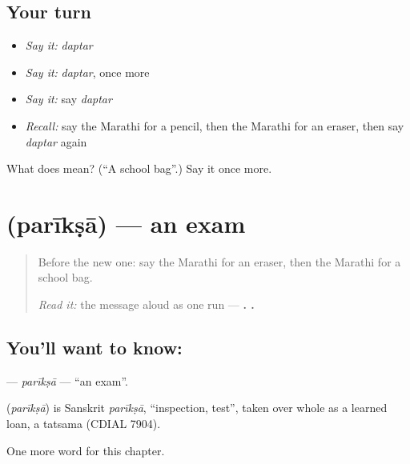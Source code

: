 \subsection*{Your turn}
\begin{itemize}
\raggedright
  \item \emph{Say it:} \emph{daptar}
  \item \emph{Say it:} \emph{daptar}, once more
  \item \emph{Say it:} say \emph{daptar}
  \item \emph{Recall:} say the Marathi for a pencil, then the Marathi for an eraser, then say \emph{daptar} again
\end{itemize}

\begin{tcolorbox}[breakable,colback=teal!4,colframe=teal!35!black,title={Before you move on}]
What does  mean? (\textquotedblleft{}A school bag\textquotedblright{}.) Say it once more.
\end{tcolorbox}
\section[\texorpdfstring{\mr{परीक्षा} (parīkṣā)}{परीक्षा (parīkṣā)}]{ (parīkṣā) — an exam}

\label{lesson:MR-C135-pariksa}



\begin{quote}
Before the new one: say the Marathi for an eraser, then the Marathi for a school bag.

\emph{Read it:} the message aloud as one run — \textbf{  .  .}
\end{quote}

\subsection*{You'll want to know: }
\textbf{} — \emph{parīkṣā} — \textquotedblleft{}an exam\textquotedblright{}.

\begin{cousinweb}
\textbf{} (\emph{parīkṣā}) is Sanskrit \emph{parīkṣā}, \textquotedblleft{}inspection, test\textquotedblright{}, taken over whole as a learned loan, a tatsama (CDIAL 7904).
\end{cousinweb}

\begin{grammarlens}[title={What you've built}]
One more word for this chapter.
\end{grammarlens}

